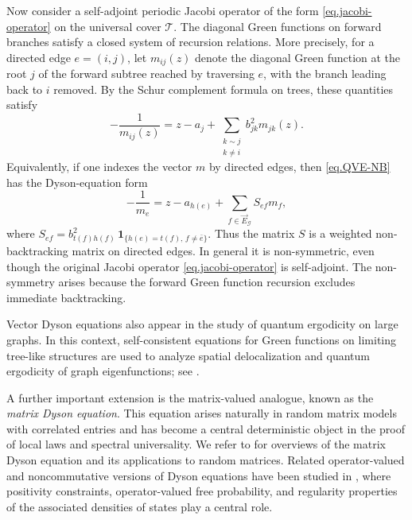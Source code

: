 \documentclass[11pt,twoside, a4paper]{article}
\numberwithin{equation}{section}
\numberwithin{figure}{section}
\theoremstyle{plain} %
\theoremstyle{definition}
\theoremstyle{remark}
\newcommand{\1} {\mspace{1 mu}}
\newcommand{\2} {\mspace{2 mu}}
\begin{document}
Now consider a self-adjoint periodic Jacobi operator of the form
\eqref{eq.jacobi-operator} on the universal cover \(\mathcal T\). The
diagonal Green functions on forward branches satisfy a closed system of
recursion relations. More precisely, for a directed edge \(e=(i,j)\), let \(m_{ij}(z)\) denote
the diagonal Green function at the root \(j\) of the forward subtree
reached by traversing \(e\), with the branch leading back to \(i\) removed.
By the Schur complement formula on trees, these quantities satisfy
\begin{equation}\label{eq.QVE-NB}
    -\frac{1}{m_{ij}(z)}
    =
    z-a_j
    +
    \sum_{\substack{k\sim j\\ k\ne i}}
    b_{jk}^2 m_{jk}(z).
\end{equation}
Equivalently, if one indexes the vector \(m\) by directed edges, then
\eqref{eq.QVE-NB} has the Dyson-equation form
\[
    -\frac{1}{m_e}
    =
    z-a_{h(e)}
    +
    \sum_{f\in \vec E_{\mathcal G}} S_{e f} m_f,
\]
where
$
    S_{e f}
    =
    b_{t(f)h(f)}^2\, \mathbf 1_{\{h(e)=t(f),\, f\neq \bar e\}}$.
Thus the matrix \(S\) is a weighted non-backtracking matrix on directed
edges. In general it is non-symmetric, even though the original Jacobi
operator \eqref{eq.jacobi-operator} is self-adjoint. The non-symmetry arises because the forward
Green function recursion excludes immediate backtracking.

Vector Dyson equations also appear in the study of quantum ergodicity on
large graphs. In this context, self-consistent equations for Green
functions on limiting tree-like structures are used to analyze spatial
delocalization and quantum ergodicity of graph eigenfunctions; see
\cite{AnantharamanSabri2019}.

A further important extension is the matrix-valued analogue, known as the
\emph{matrix Dyson equation}. This equation arises naturally in random
matrix models with correlated entries and has become a central
deterministic object in the proof of local laws and spectral universality.
We refer to
\cite{Erdos2019MDE,ajanki2019stability,erdHos2019random} for overviews of
the matrix Dyson equation and its applications to random matrices. Related
operator-valued and noncommutative versions of Dyson equations have been
studied in \cite{HeltonRashidiFarSpeicher2007,Mai2022Dyson}, where
positivity constraints, operator-valued free probability, and regularity
properties of the associated densities of states play a central role.
\end{document}
